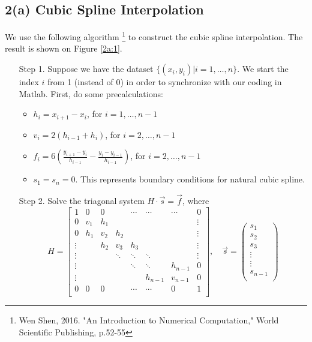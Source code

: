 \documentclass[11pt]{article}
\newcommand{\1}{\mathbbm{1}}
\newcounter{daggerfootnote}
\newcommand*{\daggerfootnote}[1]{%
	\setcounter{daggerfootnote}{\value{footnote}}%
	\renewcommand*{\thefootnote}{\fnsymbol{footnote}}%
	\footnote[2]{#1}%
	\setcounter{footnote}{\value{daggerfootnote}}%
	\renewcommand*{\thefootnote}{\arabic{footnote}}%
}
\begin{document}
\subsection*{2(a) Cubic Spline Interpolation}
We use the following algorithm\daggerfootnote{Wen Shen, 2016. "An Introduction to Numerical Computation," World Scientific Publishing, p.52-55} to construct the cubic spline interpolation. The result is shown on Figure \ref{2a:1}.
\begin{enumerate}
	\item [Step 1.] Suppose we have the dataset $\{(x_i,y_i)|i=1,\ldots,n\}$. We start the index $i$ from 1 (instead of 0) in order to synchronize with our coding in Matlab. First, do some precalculations:
	\begin{itemize}
		\item $h_i=x_{i+1}-x_i$, for $i=1,\ldots,n-1$
		\item $v_i=2(h_{i-1}+h_i)$, for $i=2,\ldots,n-1$
		\item $f_i=6\left(\frac{y_{i+1}-y_i}{h_{i-1}}-\frac{y_{i}-y_{i-1}}{h_{i-1}}\right)$, for $i=2,\ldots,n-1$
		\item $s_1=s_n=0$. This represents boundary conditions for natural cubic spline.
	\end{itemize}
	\item[Step 2.] Solve the triagonal system $H\cdot \vec{s} = \vec{f}$, where
	 \[H = \begin{bmatrix}
	 	1&0 &0  &  & \cdots & \cdots  &\cdots&0\\
		0&v_1 & h_1 &  &  &   &&\vdots \\
		0&h_1& v_2 & h_2 &  &  &&\vdots \\
		\vdots&& h_2 & v_3 & h_3 &   && \vdots \\
		\vdots&&         &  \ddots       & \ddots & \ddots&& \vdots\\
		\vdots&&         &         & \ddots & \ddots& h_{n-1}&0\\
		\vdots&&         &         &        &  h_{n-1} &v_{n-1}&0\\
		0&0 &0  &  & \cdots & \cdots  &0&1\\
	\end{bmatrix}, \quad \vec{s}= \begin{pmatrix}
	s_1\\
	s_2\\
	s_3\\
	\vdots\\
	\vdots\\
	s_{n-1}\\

\end{pmatrix}\]
\end{enumerate}
\end{document}
